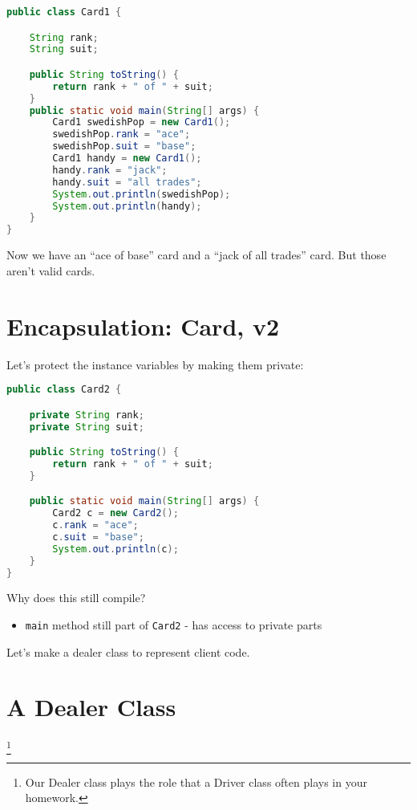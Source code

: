 \documentclass{article}
\begin{document}
\begin{lstlisting}[language=Java]
public class Card1 {

    String rank;
    String suit;

    public String toString() {
        return rank + " of " + suit;
    }
    public static void main(String[] args) {
        Card1 swedishPop = new Card1();
        swedishPop.rank = "ace";
        swedishPop.suit = "base";
        Card1 handy = new Card1();
        handy.rank = "jack";
        handy.suit = "all trades";
        System.out.println(swedishPop);
        System.out.println(handy);
    }
}
\end{lstlisting}

Now we have an ``ace of base'' card and a ``jack of all trades'' card.  But those aren't valid cards.






\section{Encapsulation: Card, v2}


Let's protect the instance variables by making them private:
\begin{lstlisting}[language=Java]
public class Card2 {

    private String rank;
    private String suit;

    public String toString() {
        return rank + " of " + suit;
    }

    public static void main(String[] args) {
        Card2 c = new Card2();
        c.rank = "ace";
        c.suit = "base";
        System.out.println(c);
    }
}
\end{lstlisting}

Why does this still compile?

\begin{itemize}
\item {\tt main} method still part of {\tt Card2} - has access to private parts
\end{itemize}
Let's make a dealer class to represent client code.





\section{A Dealer Class}\footnote{Our Dealer class plays the role that a Driver class often plays in your homework.}
\end{document}
